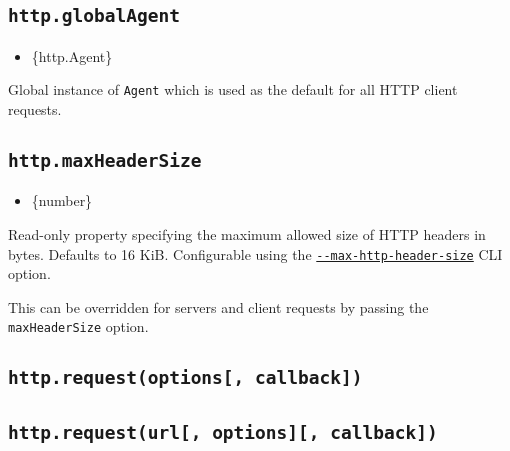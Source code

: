 \subsection{\texorpdfstring{\texttt{http.globalAgent}}{http.globalAgent}}\label{http.globalagent}

\begin{itemize}
\tightlist
\item
  \{http.Agent\}
\end{itemize}

Global instance of \texttt{Agent} which is used as the default for all
HTTP client requests.

\subsection{\texorpdfstring{\texttt{http.maxHeaderSize}}{http.maxHeaderSize}}\label{http.maxheadersize}

\begin{itemize}
\tightlist
\item
  \{number\}
\end{itemize}

Read-only property specifying the maximum allowed size of HTTP headers
in bytes. Defaults to 16 KiB. Configurable using the
\href{cli.md\#--max-http-header-sizesize}{\texttt{-\/-max-http-header-size}}
CLI option.

This can be overridden for servers and client requests by passing the
\texttt{maxHeaderSize} option.

\subsection{\texorpdfstring{\texttt{http.request(options{[},\ callback{]})}}{http.request(options{[}, callback{]})}}\label{http.requestoptions-callback}

\subsection{\texorpdfstring{\texttt{http.request(url{[},\ options{]}{[},\ callback{]})}}{http.request(url{[}, options{]}{[}, callback{]})}}\label{http.requesturl-options-callback}

